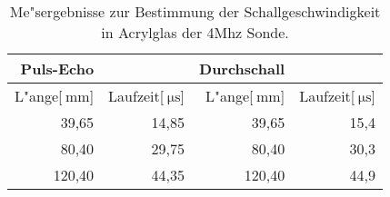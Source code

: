 
\begin{table}[!h]
\begin{center}
\begin{tabular}{|r|r|r|r|}
\hline
Puls-Echo & & Durchschall &\\
\hline
 L"ange[$\SI{}{\milli\meter}$] & Laufzeit[$\SI{}{\micro\second}$] & L"ange[$\SI{}{\milli\meter}$] & Laufzeit[$\SI{}{\micro\second}$]\\
\hline
\hline
 39,65 &	14,85 &	 39,65 &	15,4\\
 80,40 &	29,75 &	 80,40 &	30,3\\
120,40 &	44,35 &	120,40 &	44,9\\
\hline
\end{tabular}
\caption[]{Me"sergebnisse zur Bestimmung der Schallgeschwindigkeit in Acrylglas der 4Mhz Sonde.}
\label{a4}
\end{center}
\end{table}